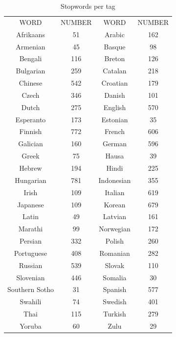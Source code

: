 \documentclass[sigconf,12pt,review=false,natbib=false]{acmart}
\begin{document}
\begin{table}
    \caption{Stopwords per tag}
    \label{tab:stopwords}
    \begin{minipage}{\columnwidth}
    \begin{center}
    \begin{tabular}{c c c c}
        \toprule
            WORD & NUMBER & WORD & NUMBER\\
        Afrikaans & 51 & Arabic & 162\\
        Armenian & 45 & Basque & 98 \\
        Bengali & 116 & Breton & 126 \\
        Bulgarian & 259 & Catalan & 218\\
        Chinese & 542 & Croatian & 179 \\
        Czech & 346 & Danish & 101 \\
        Dutch & 275 & English & 570 \\
        Esperanto & 173 & Estonian & 35 \\
        Finnish & 772 & French & 606 \\
        Galician & 160 & German & 596 \\
        Greek & 75 & Hausa & 39 \\
        Hebrew & 194 & Hindi & 225 \\
        Hungarian & 781 & Indonesian & 355 \\
        Irish & 109 & Italian & 619 \\
        Japanese & 109 & Korean & 679 \\
        Latin & 49 & Latvian & 161 \\
        Marathi & 99 & Norwegian & 172 \\
        Persian & 332 & Polish & 260 \\
        Portuguese & 408 & Romanian & 282 \\
        Russian & 539 & Slovak & 110 \\
        Slovenian & 446 & Somalia & 30 \\
        Southern Sotho & 31 & Spanish  & 577 \\
        Swahili & 74 & Swedish & 401 \\
        Thai & 115 & Turkish & 279 \\
        Yoruba & 60 & Zulu & 29 \\
    \end{tabular}
    \end{center}
    \end{minipage}
\end{table}
\end{document}
